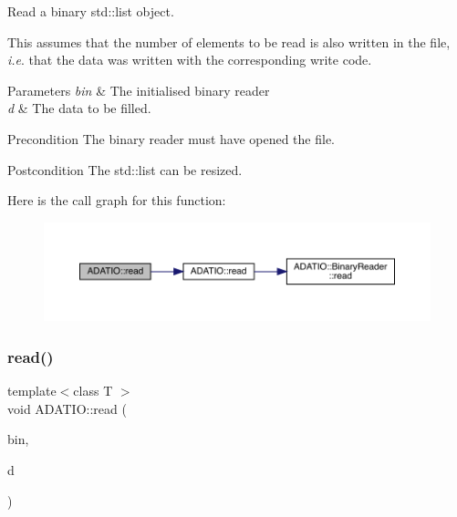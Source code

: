 Read a binary std\+::list object. 

This assumes that the number of elements to be read is also written in the file, {\itshape i.\+e}. that the data was written with the corresponding write code. 
\begin{DoxyParams}{Parameters}
{\em bin} & The initialised binary reader \\
\hline
{\em d} & The data to be filled.\\
\hline
\end{DoxyParams}
\begin{DoxyPrecond}{Precondition}
The binary reader must have opened the file. 
\end{DoxyPrecond}
\begin{DoxyPostcond}{Postcondition}
The std\+::list can be resized. 
\end{DoxyPostcond}
Here is the call graph for this function\+:
\nopagebreak
\begin{figure}[H]
\begin{center}
\leavevmode
\includegraphics[width=350pt]{d0/dba/namespaceADATIO_a6b74b694d784ffa233957d276d10528d_cgraph}
\end{center}
\end{figure}
\mbox{\label{namespaceADATIO_aee4123faea4044073f3c166dab12cb9e}} 
\subsubsection{\texorpdfstring{read()}{read()}\hspace{0.1cm}{\footnotesize\ttfamily [26/28]}}
{\footnotesize\ttfamily template$<$class T $>$ \\
void A\+D\+A\+T\+I\+O\+::read (\begin{DoxyParamCaption}\item[{\mbox{\hyperlink{classADATIO_1_1BinaryReader}{Binary\+Reader}} \&}]{bin,  }\item[{\mbox{\hyperlink{classADAT_1_1Array1dO}{A\+D\+A\+T\+::\+Array1dO}}$<$ T $>$ \&}]{d }\end{DoxyParamCaption})\hspace{0.3cm}{\ttfamily [inline]}}



